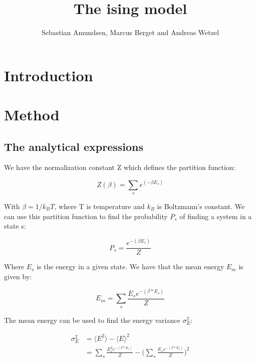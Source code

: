 \documentclass{article}
\begin{document}
\title{The ising model}
\author{Sebastian Amundsen, Marcus Berget and Andreas Wetzel}

\maketitle

\begin{abstract}

\end{abstract}

\begin{multicols}{2}

\section{Introduction}



\section{Method}

\subsection*{The analytical expressions}

We have the normalization constant Z which defines the partition function:

\begin{equation}
Z(\beta) = \sum_{s} e^{(-\beta E_s)}
\label{eq:Z}
\end{equation}

With $\beta=1/k_BT$, where T is temperature and $k_B$ is Boltzmann's constant. We can use this partition function to find the probability $P_s$ of finding a system in a state s:

\begin{equation}
P_s=\frac{e^{-(\beta E_s)}}{Z}
\label{eq:P_s}
\end{equation}

Where $E_s$ is the energy in a given state. We have that the mean energy $E_m$ is given by:

\begin{equation}
E_m = \sum_s \frac{E_s e^{-(\beta*E_s)}}{Z}
\label{eq:E_m}
\end{equation}

The mean energy can be used to find the energy variance $\sigma_E^2$:

\begin{equation}
\begin{split}
\sigma_E^2 &= \langle E^2 \rangle - \langle E \rangle^2 \\
&= \sum_s \frac{E_s^2 e^{-(\beta*E_s)}}{Z} - \bigg(\sum_s \frac{E_s e^{-(\beta*E_s)}}{Z}\bigg)^2
\end{split}
\label{eq:E_v}
\end{equation}


\end{multicols}
\end{document}
